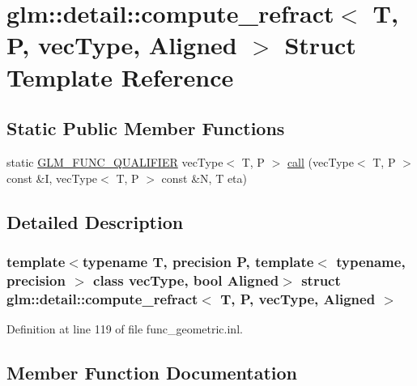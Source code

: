 \hypertarget{structglm_1_1detail_1_1compute__refract}{}\section{glm\+::detail\+::compute\+\_\+refract$<$ T, P, vec\+Type, Aligned $>$ Struct Template Reference}
\label{structglm_1_1detail_1_1compute__refract}
\subsection*{Static Public Member Functions}
\begin{DoxyCompactItemize}
\item 
static \mbox{\hyperlink{setup_8hpp_a33fdea6f91c5f834105f7415e2a64407}{G\+L\+M\+\_\+\+F\+U\+N\+C\+\_\+\+Q\+U\+A\+L\+I\+F\+I\+ER}} vec\+Type$<$ T, P $>$ \mbox{\hyperlink{structglm_1_1detail_1_1compute__refract_a62599a8a75bbedf57bbf271350984669}{call}} (vec\+Type$<$ T, P $>$ const \&I, vec\+Type$<$ T, P $>$ const \&N, T eta)
\end{DoxyCompactItemize}


\subsection{Detailed Description}
\subsubsection*{template$<$typename T, precision P, template$<$ typename, precision $>$ class vec\+Type, bool Aligned$>$\newline
struct glm\+::detail\+::compute\+\_\+refract$<$ T, P, vec\+Type, Aligned $>$}



Definition at line 119 of file func\+\_\+geometric.\+inl.



\subsection{Member Function Documentation}
\mbox{\label{structglm_1_1detail_1_1compute__refract_a62599a8a75bbedf57bbf271350984669}} 
